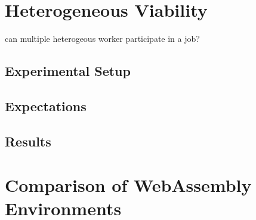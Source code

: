 \section{Heterogeneous Viability}
\label{sec:evaluation:batch}
can multiple heterogeous worker participate in a job?

\subsection{Experimental Setup}

\subsection{Expectations}

\subsection{Results}

\section{Comparison of WebAssembly Environments}